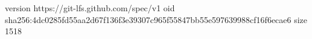 version https://git-lfs.github.com/spec/v1
oid sha256:4dc0285fd55aa2d67f136f3e39307c965f55847bb55e597639988cf16f6ecae6
size 1518
